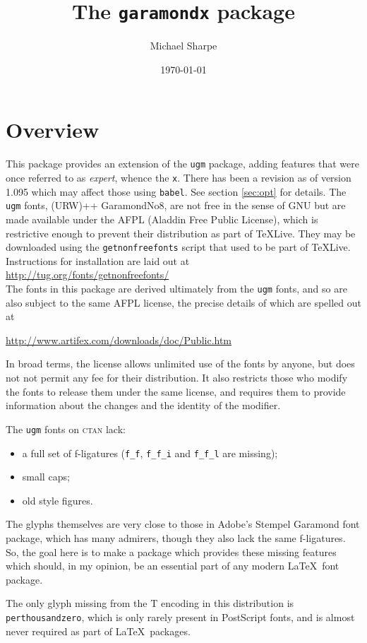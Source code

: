 \documentclass[11pt]{article}
\title{The \texttt{garamondx} package}
\author{Michael Sharpe}
\date{\today}  %
\begin{document}
\maketitle
\section{Overview}
This package provides an extension of the \texttt{ugm} package, adding features that were once referred to as \emph{expert}, whence the \texttt{x}. There has been a revision as of version 1.095 which may affect those using {\tt babel}. See section \ref{sec:opt} for details. The \texttt{ugm} fonts, (URW)++ GaramondNo8, are not free in the sense of GNU but are made available under the AFPL (Aladdin Free Public License), which is restrictive enough to prevent their distribution as part of \TeX Live. They may be downloaded  using the \texttt{getnonfreefonts} script that used to be part of \TeX Live. Instructions for installation are laid out at\\
\url{http://tug.org/fonts/getnonfreefonts/}\\
The fonts in this package are derived ultimately from the \texttt{ugm} fonts, and so are also subject to the same AFPL license, the precise details of which are spelled out at

\url{http://www.artifex.com/downloads/doc/Public.htm}

In broad terms, the license allows unlimited use of the fonts by anyone, but does not not permit any fee for their distribution. It also restricts those who modify the fonts to release them under the same license, and requires them to provide information about the changes and the identity of the modifier.

The \texttt{ugm} fonts on \textsc{ctan} lack:
\begin{itemize}
\item
a full set of f-ligatures (\verb|f_f|, \verb|f_f_i| and \verb|f_f_l| are missing);
\item small caps;
\item old style figures.
\end{itemize} 
The glyphs themselves are very close to those in Adobe's Stempel Garamond font package, which has many admirers, though they also lack the same f-ligatures. So, the goal here is to make a package which provides these missing features which should, in my opinion, be an essential part of any modern \LaTeX\ font package.

The only glyph missing from the T encoding in this distribution is \texttt{perthousandzero}, which is only rarely present in PostScript fonts, and is almost never required as part of \LaTeX\ packages.
\end{document}
